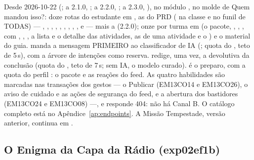 Desde 2026-10-22 (; a 2.1.0, ; a 2.2.0,
; a 2.3.0, ), no módulo , no molde de Quem mandou
isso?: doze rotas do estudante em , as do PRD
( na classe e  no funil de
TODAS) --- , , , ,
, , , ,
,  e  --- mais a 
(2.2.0); onze por turma em  (o
pacote, , , , 
com , , , a lista e o detalhe das
atividades, as  de uma atividade e o ) e o
material do guia.  manda a mensagem PRIMEIRO ao
classificador de IA (; quota do , teto de 5\,s),
com a árvore de intenções como reserva. 
redige, uma vez, a devolutiva da conclusão (quota do , teto de
7\,s; sem IA, o modelo curado).  é o preparo,
com a quota do perfil : o pacote e as reações do feed. As quatro habilidades são
marcadas nas transações dos gestos --- o Publicar (EM13CO14 e EM13CO26), o
aviso de cuidado e as ações de segurança do feed, e a abertura dos bastidores
(EM13CO24 e EM13CO08) ---, e 
responde 404: não há Canal B. O catálogo completo está no
Apêndice~\ref{ap:endpoints}. A Missão Tempestade, versão anterior, continua em
.

\subsection{O Enigma da Capa da Rádio (exp02ef1b)}
\label{sec:api-enigma-capa}



